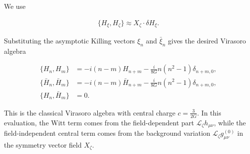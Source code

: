 We use

\begin{align}
\{H_\xi,H_\zeta\}\approx X_\zeta\cdot\delta H_\xi.
\end{align}

Substituting the asymptotic Killing vectors \(\xi _{n}\) and \(\bar{\xi}_{n}\) gives the desired Virasoro algebra

\begin{align}
\{H_n,H_m\}&=-i(n-m)H_{n+m}-\frac{i}{8G}n(n^2-1)\delta_{n+m,0},\\
\{\bar H_n,\bar H_m\}&=-i(n-m)\bar H_{n+m}-\frac{i}{8G}n(n^2-1)\delta_{n+m,0},\\
\{H_n,\bar H_m\}&=0.
\end{align}

This is the classical Virasoro algebra with central charge \(c=\frac{3}{2G}\). In this evaluation, the Witt term comes from the field-dependent part \(\mathcal{L}_{\zeta}h_{\mu\nu}\), while the field-independent central term comes from the background variation \(\mathcal{L}_{\zeta}g^{(0)}_{\mu\nu}\) in the symmetry vector field \(X_{\zeta}\).
